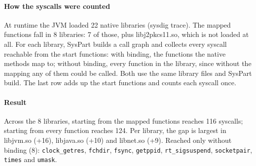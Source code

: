 \documentclass[10pt]{article}
\begin{document}
\paragraph*{How the syscalls were counted}
At runtime the JVM loaded 22 native libraries (sysdig trace). The mapped functions fall in 8 libraries: 7 of those, plus libj2pkcs11.so, which is not loaded at all. For each library, SysPart builds a call graph and collects every syscall reachable from the start functions: with binding, the functions the native methods map to; without binding, every function in the library, since without the mapping any of them could be called. Both use the same library files and SysPart build. The last row adds up the start functions and counts each syscall once.

\paragraph*{Result}
Across the 8 libraries, starting from the mapped functions reaches 116 syscalls; starting from every function reaches 124. Per library, the gap is largest in libjvm.so (+16), libjava.so (+10) and libnet.so (+9). Reached only without binding (8): \texttt{clock\_getres}, \texttt{fchdir}, \texttt{fsync}, \texttt{getppid}, \texttt{rt\_sigsuspend}, \texttt{socketpair}, \texttt{times} and \texttt{umask}.
\end{document}
